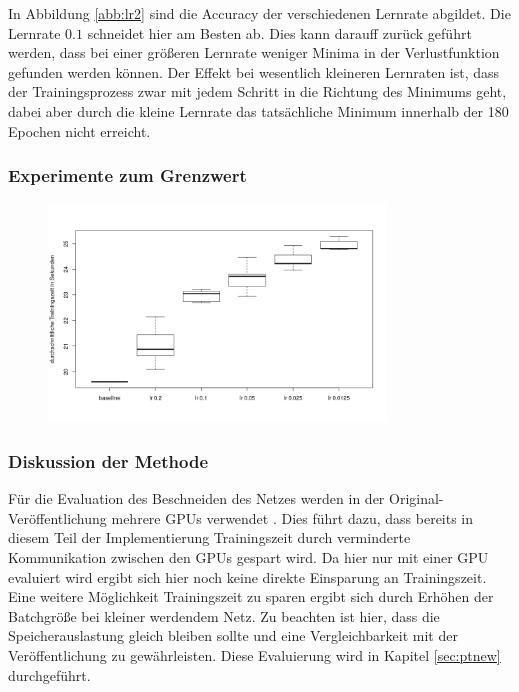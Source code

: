  In Abbildung \ref{abb:lr2} sind die Accuracy der verschiedenen Lernrate abgildet. Die Lernrate $0.1$ schneidet hier am Besten ab. Dies kann darauff zurück geführt werden, dass bei einer größeren Lernrate weniger Minima in der Verlustfunktion gefunden werden können. Der Effekt bei wesentlich kleineren Lernraten ist, dass der Trainingsprozess zwar mit jedem Schritt in die Richtung des Minimums geht, dabei aber durch die kleine Lernrate das tatsächliche Minimum innerhalb der 180 Epochen nicht erreicht.
 
 
 
 \subsubsection{Experimente zum Grenzwert}


\begin{figure}[h]
 \centering
 \includegraphics[width=0.8\textwidth]{KapitelPartB/Images/lr1.png}
 \label{ref:lra}
\end{figure}



 

\subsubsection{Diskussion der Methode}

Für die Evaluation des Beschneiden des Netzes werden in der Original-Veröffentlichung mehrere GPUs verwendet \cite{prunetrain}. Dies führt dazu, dass bereits in diesem Teil der Implementierung Trainingszeit durch verminderte Kommunikation zwischen den GPUs gespart wird. Da hier nur mit einer GPU evaluiert wird ergibt sich hier noch keine direkte Einsparung an Trainingszeit. Eine weitere Möglichkeit Trainingszeit zu sparen ergibt sich durch Erhöhen der Batchgröße bei kleiner werdendem Netz. Zu beachten ist hier, dass die Speicherauslastung gleich bleiben sollte und eine Vergleichbarkeit mit der Veröffentlichung zu gewährleisten. Diese Evaluierung wird in Kapitel \ref{sec:ptnew} durchgeführt.


